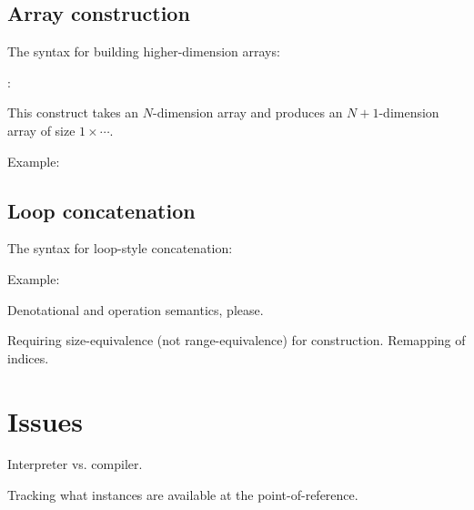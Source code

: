 \subsection{Array construction}
\label{sec:arrays:aggregate:construction}

The syntax for building higher-dimension arrays:

 : \ttt{\{}  \ttt{\}} 

This construct takes an $N$-dimension array and produces an 
$N+1$-dimension array of size $1\times\cdots$.

Example:

\subsection{Loop concatenation}
\label{sec:arrays:aggregate:loopcat}

The syntax for loop-style concatenation:

\ttt{( \# :}  \ttt{:}  \ttt{:}
	 \ttt{)}

Example:

Denotational and operation semantics, please.

Requiring size-equivalence (not range-equivalence) for construction.
Remapping of indices.  

\section{Issues}
\label{sec:arrays:issues}

Interpreter vs. compiler.

Tracking what instances are available at the point-of-reference.  

